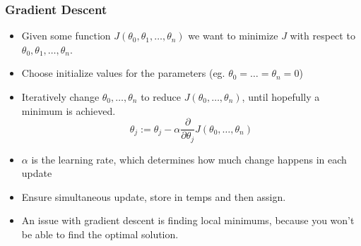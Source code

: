 \subsubsection{Gradient Descent}
\begin{itemize}[--]
	\item Given some function $J(\theta_0, \theta_1,\ldots ,\theta_n)$ we want to minimize $J$ with respect to $\theta_0, \theta_1,\ldots ,\theta_n$. 
	\item Choose initialize values for the parameters (eg. $\theta_0=\ldots=\theta_n =0$)
	\item Iteratively change $\theta_0, \ldots, \theta_n$ to reduce $J(\theta_0, \ldots, \theta_n )$, until hopefully a minimum is achieved.
	$$\theta_j := \theta_j - \alpha \frac{\partial}{\partial \theta_j}J(\theta_0,\ldots, \theta_n)$$
	\item $\alpha$ is the learning rate, which determines how much change happens in each update
 	\item Ensure simultaneous update, store in temps and then assign.
	\item An issue with gradient descent is finding local minimums, because you won't be able to find the optimal solution. 
\end{itemize}

